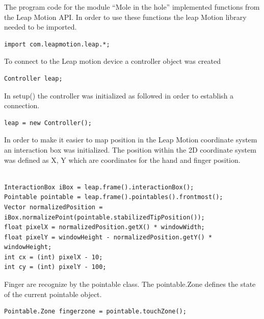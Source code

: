 The program code for the module “Mole in the hole” implemented functions from the Leap Motion API. In order to use these functions the leap Motion library needed to be imported.

\lstset{language=Java}
\begin{lstlisting}[caption = {Leap Motion library}, label={lst:Java}]
import com.leapmotion.leap.*;
\end{lstlisting}

To connect to the Leap motion device a controller object was created

\lstset{language=Java}
\begin{lstlisting}[caption = {Controller object}, label={lst:Java}]
Controller leap;
\end{lstlisting}

In setup() the controller was initialized as followed in order to establish a connection.

\lstset{language=Java}
\begin{lstlisting}[caption = {Initialization of controller object}, label={lst:Java}]
leap = new Controller();
\end{lstlisting}

In order to make it easier to map position in the Leap Motion coordinate system an interaction box was initialized. The position within the 2D coordinate system was defined as X, Y which are coordinates for the hand and finger position. 

\lstset{language=Java}
\begin{lstlisting}[caption = {InteractionBox object}, label={lst:Java}]

InteractionBox iBox = leap.frame().interactionBox();
Pointable pointable = leap.frame().pointables().frontmost();
Vector normalizedPosition = iBox.normalizePoint(pointable.stabilizedTipPosition());
float pixelX = normalizedPosition.getX() * windowWidth;
float pixelY = windowHeight - normalizedPosition.getY() * windowHeight;
int cx = (int) pixelX - 10;
int cy = (int) pixelY - 100;

\end{lstlisting}

Finger are recognize by the pointable class. The pointable.Zone defines the state of the current pointable object.

\lstset{language=Java}
\begin{lstlisting}[caption = {Touch zone}, label={lst:Java}]
 Pointable.Zone fingerzone = pointable.touchZone();
\end{lstlisting}


